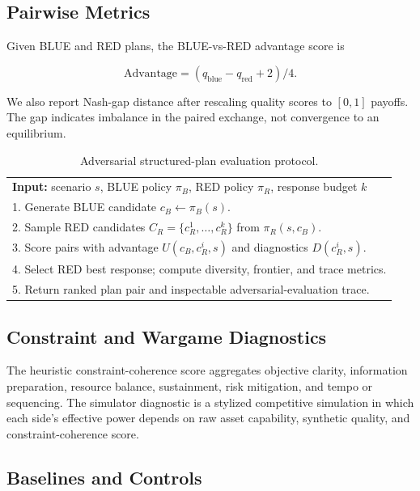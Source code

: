 \documentclass[letterpaper]{article} %
\begin{document}
\subsection{Pairwise Metrics}

Given BLUE and RED plans, the BLUE-vs-RED advantage score is

\begin{equation}
\mathrm{Advantage} = (q_{\mathrm{blue}} - q_{\mathrm{red}} + 2) / 4.
\end{equation}

We also report Nash-gap distance after rescaling quality scores to $[0,1]$ payoffs. The gap indicates imbalance in the paired exchange, not convergence to an equilibrium.

\begin{table}[t]
\centering
\scriptsize
\caption{Adversarial structured-plan evaluation protocol.}
\label{tab:algorithm}
\begin{tabular}{@{}p{.96\linewidth}@{}}
\toprule
\textbf{Input:} scenario $s$, BLUE policy $\pi_B$, RED policy $\pi_R$, response budget $k$ \\
1. Generate BLUE candidate $c_B \leftarrow \pi_B(s)$. \\
2. Sample RED candidates $C_R=\{c_R^1,\ldots,c_R^k\}$ from $\pi_R(s,c_B)$. \\
3. Score pairs with advantage $U(c_B,c_R^i,s)$ and diagnostics $D(c_R^i,s)$. \\
4. Select RED best response; compute diversity, frontier, and trace metrics. \\
5. Return ranked plan pair and inspectable adversarial-evaluation trace. \\
\bottomrule
\end{tabular}
\end{table}

\subsection{Constraint and Wargame Diagnostics}

The heuristic constraint-coherence score aggregates objective clarity, information preparation, resource balance, sustainment, risk mitigation, and tempo or sequencing. The simulator diagnostic is a stylized competitive simulation in which each side's effective power depends on raw asset capability, synthetic quality, and constraint-coherence score.

\subsection{Baselines and Controls}
\end{document}
